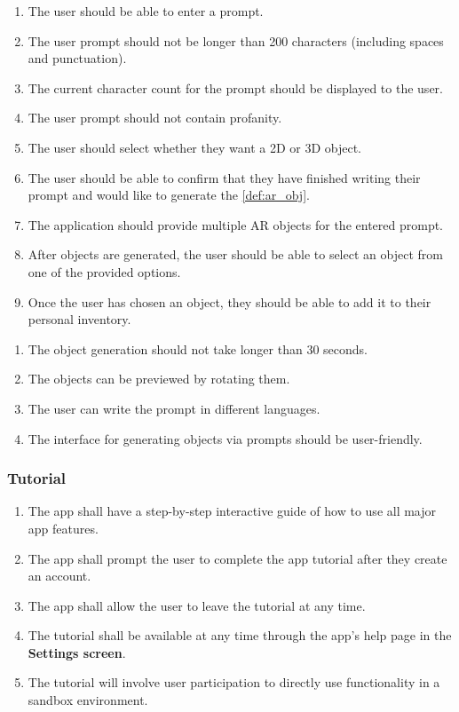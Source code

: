 \documentclass{article}
\begin{document}
\begin{enumerate}[label=POG-FR\arabic*:]
    \item The user should be able to enter a prompt.
    \item The user prompt should not be longer than 200 characters (including spaces and punctuation).
    \item The current character count for the prompt should be displayed to the user.
    \item The user prompt should not contain profanity.
    \item The user should select whether they want a 2D or 3D object.
    \item The user should be able to confirm that they have finished writing their prompt and would like to generate the \ref{def:ar_obj}.
    \item The application should provide multiple AR objects for the entered prompt.
    \item After objects are generated, the user should be able to select an object from one of the provided options.
    \item Once the user has chosen an object, they should be able to add it to their personal inventory.
\end{enumerate}

\begin{enumerate}[label=POG-NFR\arabic*:]
    \item The object generation should not take longer than 30 seconds.
    \item The objects can be previewed by rotating them.
    \item The user can write the prompt in different languages.
    \item The interface for generating objects via prompts should be user-friendly.
\end{enumerate}

\subsubsection{Tutorial}
\label{ssub:tutorial}

\begin{enumerate}[align=left, label=\textbf{TU-FR\arabic*:}]
    \item The app shall have a step-by-step interactive guide of how to use all major app features.
    \item The app shall prompt the user to complete the app tutorial after they create an account.
    \item The app shall allow the user to leave the tutorial at any time.
    \item The tutorial shall be available at any time through the app's help page in the \textbf{Settings screen}.
    \item The tutorial will involve user participation to directly use functionality in a sandbox environment.
\end{enumerate}
\end{document}
